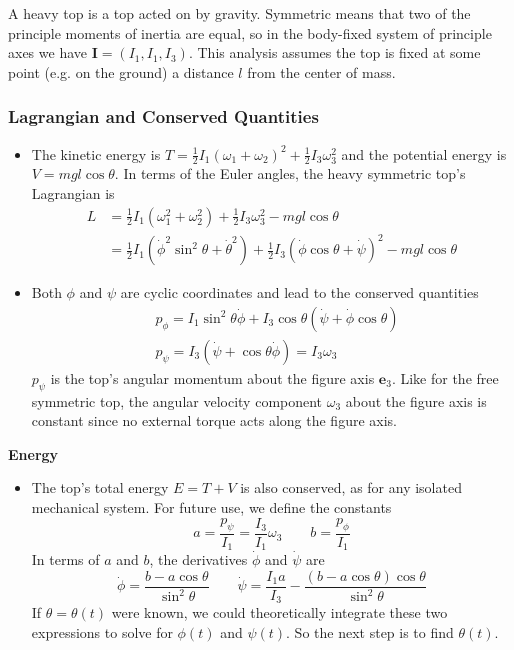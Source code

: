 \documentclass[11pt, a4paper]{article}
\newcommand{\e}{\bm{e}} %
\begin{document}
A heavy top is a top acted on by gravity. Symmetric means that two of the principle moments of inertia are equal, so in the body-fixed system of principle axes we have $ \mathbf{I} = (I_1, I_1, I_3) $. This analysis assumes the top is fixed at some point (e.g. on the ground) a distance $ l $ from the center of mass.


\subsubsection{Lagrangian and Conserved Quantities}
\begin{itemize}
	\item The kinetic energy is $ T = \frac{1}{2}I_1(\omega_1 + \omega_2)^2 + \frac{1}{2}I_3 \omega_3^2 $ and the potential energy is $ V = mgl \cos \theta $. In terms of the Euler angles, the heavy symmetric top's Lagrangian is
	\begin{align*}
		L &= \frac{1}{2}I_1\left (\omega_1^{2} + \omega_2^{2}\right ) + \frac{1}{2}I_3 \omega_3^2  -  mgl \cos \theta\\
		&= \frac{1}{2} I_1\left (\dot{\phi}^2 \sin^2 \theta + \dot{\theta}^2\right ) + \frac{1}{2}I_3 \left (\dot{\phi} \cos \theta + \dot{\psi} \right )^2 -  mgl \cos \theta
	\end{align*}
	
	\item Both $ \phi $ and $ \psi $ are cyclic coordinates and lead to the conserved quantities
	\begin{align*}
		&p_{\phi} = I_1 \sin^{2}\theta \dot{\phi} + I_3 \cos \theta (\dot{\psi} + \dot{\phi} \cos \theta)\\
		&p_{\psi} = I_{3}\left(\dot{\psi} + \cos \theta \dot{\phi} \right) = I_3 \omega_3
	\end{align*}
	$ p_{\psi} $ is the top's angular momentum about the figure axis $ \e_{3} $. Like for the free symmetric top, the angular velocity component $ \omega_3 $  about the figure axis is constant since no external torque acts along the figure axis. 
\end{itemize}

\textbf{Energy}
\begin{itemize}
	\item The top's total energy $ E = T + V $ is also conserved, as for any isolated mechanical system. For future use, we define the constants
	\begin{equation*}
		a = \frac{p_{\psi}}{I_{1}} = \frac{I_3}{I_1}\omega_3 \qquad b = \frac{p_{\phi}}{I_1}
	\end{equation*}
	In terms of $ a $ and $ b $, the derivatives $ \dot{\phi} $ and $ \dot{\psi} $ are
	\begin{equation*}
		\dot \phi = \frac{b-a\cos\theta}{\sin^2 \theta} \qquad \dot \psi = \frac{I_1a}{I_3} - \frac{(b- a\cos\theta)\cos \theta}{\sin^2 \theta}
	\end{equation*}
	If $ \theta = \theta(t) $ were known, we could theoretically integrate these two expressions to solve for $ \phi(t) $ and $ \psi(t) $. So the next step is to find $ \theta(t) $.
\end{itemize}
\end{document}
